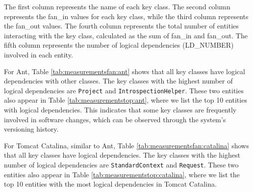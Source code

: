 The first column represents the name of each key class. The second column represents the fan\_in values for each key class, while the third column represents the fan\_out values. The fourth column represents the total number of entities interacting with the key class, calculated as the sum of fan\_in and fan\_out. The fifth column represents the number of logical dependencies (LD\_NUMBER) involved in each entity.

For Ant, Table \ref{tab:measurementsfan:ant} shows that all key classes have logical dependencies with other classes. The key classes with the highest number of logical dependencies are \texttt{Project} and \texttt{IntrospectionHelper}. These two entities also appear in Table \ref{tab:measurementstop:ant}, where we list the top 10 entities with logical dependencies. This indicates that some key classes are frequently involved in software changes, which can be observed through the system’s versioning history.


\begin{table}[!h]
\renewcommand{\arraystretch}{1}
\caption{Measurements for Ant key classes}
\label{tab:measurementsfan:ant}
\centering
{}
\end{table}


For Tomcat Catalina, similar to Ant, Table \ref{tab:measurementsfan:catalina} shows that all key classes have logical dependencies. The key classes with the highest number of logical dependencies are \texttt{StandardContext} and \texttt{Request}. These two entities also appear in Table \ref{tab:measurementstop:catalina}, where we list the top 10 entities with the most logical dependencies in Tomcat Catalina.

